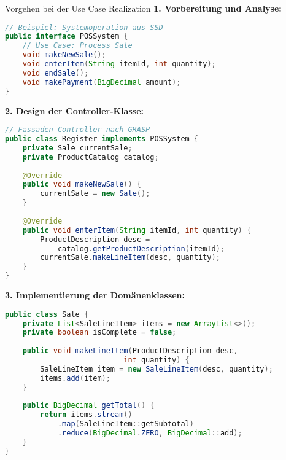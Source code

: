 \begin{KR}{Vorgehen bei der Use Case Realization}
\textbf{1. Vorbereitung und Analyse:}
\begin{lstlisting}[language=Java]
// Beispiel: Systemoperation aus SSD
public interface POSSystem {
    // Use Case: Process Sale
    void makeNewSale();
    void enterItem(String itemId, int quantity);
    void endSale();
    void makePayment(BigDecimal amount);
}
\end{lstlisting}

\textbf{2. Design der Controller-Klasse:}
\begin{lstlisting}[language=Java]
// Fassaden-Controller nach GRASP
public class Register implements POSSystem {
    private Sale currentSale;
    private ProductCatalog catalog;
    
    @Override
    public void makeNewSale() {
        currentSale = new Sale();
    }
    
    @Override
    public void enterItem(String itemId, int quantity) {
        ProductDescription desc = 
            catalog.getProductDescription(itemId);
        currentSale.makeLineItem(desc, quantity);
    }
}
\end{lstlisting}

\textbf{3. Implementierung der Domänenklassen:}
\begin{lstlisting}[language=Java]
public class Sale {
    private List<SaleLineItem> items = new ArrayList<>();
    private boolean isComplete = false;
    
    public void makeLineItem(ProductDescription desc, 
                           int quantity) {
        SaleLineItem item = new SaleLineItem(desc, quantity);
        items.add(item);
    }
    
    public BigDecimal getTotal() {
        return items.stream()
            .map(SaleLineItem::getSubtotal)
            .reduce(BigDecimal.ZERO, BigDecimal::add);
    }
}
\end{lstlisting}
\end{KR}

